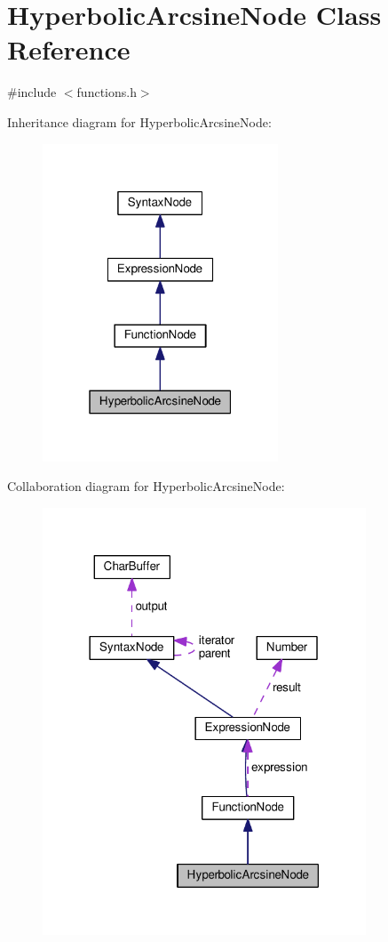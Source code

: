 \hypertarget{classHyperbolicArcsineNode}{}\section{Hyperbolic\+Arcsine\+Node Class Reference}
\label{classHyperbolicArcsineNode}


{\ttfamily \#include $<$functions.\+h$>$}



Inheritance diagram for Hyperbolic\+Arcsine\+Node\+:
\nopagebreak
\begin{figure}[H]
\begin{center}
\leavevmode
\includegraphics[width=199pt]{dd/de6/classHyperbolicArcsineNode__inherit__graph}
\end{center}
\end{figure}


Collaboration diagram for Hyperbolic\+Arcsine\+Node\+:
\nopagebreak
\begin{figure}[H]
\begin{center}
\leavevmode
\includegraphics[width=273pt]{d6/d84/classHyperbolicArcsineNode__coll__graph}
\end{center}
\end{figure}
